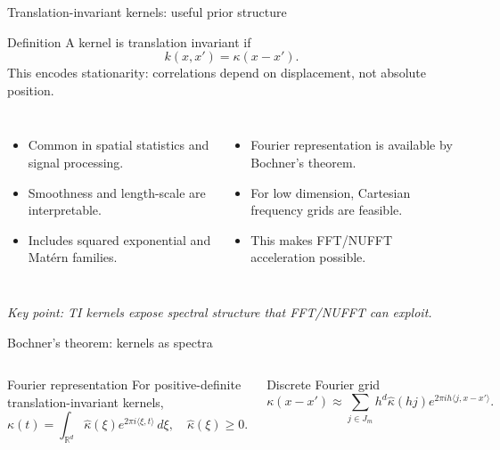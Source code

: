\documentclass[aspectratio=169,11pt]{ctexbeamer}
\newcommand{\R}{\mathbb{R}}
\newcommand{\y}{\mathbf{y}}
\begin{document}
\begin{frame}{Translation-invariant kernels: useful prior structure}
\begin{block}{Definition}
A kernel is translation invariant if
\[
 k(x,x')=\kappa(x-x').
\]
This encodes stationarity: correlations depend on displacement, not absolute position.
\end{block}
\begin{columns}[T,onlytextwidth]
\begin{itemize}
  \item Common in spatial statistics and signal processing.
  \item Smoothness and length-scale are interpretable.
  \item Includes squared exponential and Mat\'ern families.
\end{itemize}
\begin{itemize}
  \item Fourier representation is available by Bochner's theorem.
  \item For low dimension, Cartesian frequency grids are feasible.
  \item This makes FFT/NUFFT acceleration possible.
\end{itemize}
\end{columns}
\vspace{0.05cm}
\small\textit{Key point: TI kernels expose spectral structure that FFT/NUFFT can exploit.}
\end{frame}

\begin{frame}{Bochner's theorem: kernels as spectra}
\begin{columns}[T,onlytextwidth]
\begin{block}{Fourier representation}
For positive-definite translation-invariant kernels,
\[
\kappa(t)=\int_{\R^d}\widehat\kappa(\xi)e^{2\pi i\langle \xi,t\rangle}\,d\xi,
\quad \widehat\kappa(\xi)\geq 0.
\]
\end{block}
\begin{block}{Discrete Fourier grid}
\[
\kappa(x-x')\approx
\sum_{j\in J_m}h^d\widehat\kappa(hj)e^{2\pi ih\langle j,x-x'\rangle}.
\]
\end{block}
\begin{center}
\end{center}
\end{columns}
\end{frame}
\end{document}

